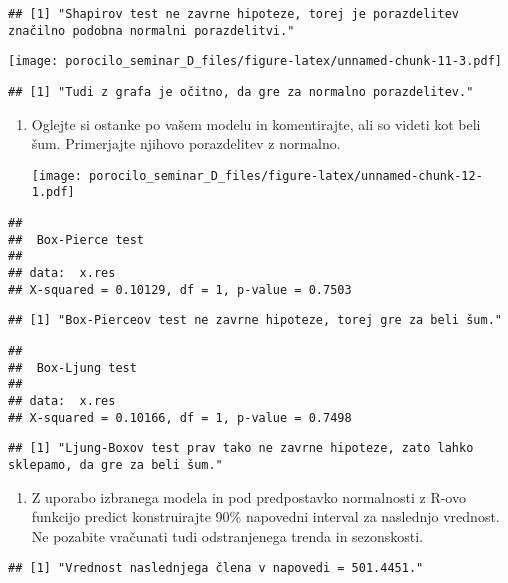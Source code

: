 \documentclass[
]{article}
\providecommand{\tightlist}{%
  \setlength{\itemsep}{0pt}\setlength{\parskip}{0pt}}
\begin{document}
\begin{verbatim}
## [1] "Shapirov test ne zavrne hipoteze, torej je porazdelitev značilno podobna normalni porazdelitvi."
\end{verbatim}

\texttt{[image: porocilo\_seminar\_D\_files/figure-latex/unnamed-chunk-11-3.pdf]}

\begin{verbatim}
## [1] "Tudi z grafa je očitno, da gre za normalno porazdelitev."
\end{verbatim}

\begin{enumerate}
\def\labelenumi{\arabic{enumi}.}
\setcounter{enumi}{6}
\tightlist
\item
  Oglejte si ostanke po vašem modelu in komentirajte, ali so videti kot
  beli šum. Primerjajte njihovo porazdelitev z normalno.

  \texttt{[image: porocilo\_seminar\_D\_files/figure-latex/unnamed-chunk-12-1.pdf]}
\end{enumerate}

\begin{verbatim}
## 
##  Box-Pierce test
## 
## data:  x.res
## X-squared = 0.10129, df = 1, p-value = 0.7503
\end{verbatim}

\begin{verbatim}
## [1] "Box-Pierceov test ne zavrne hipoteze, torej gre za beli šum."
\end{verbatim}

\begin{verbatim}
## 
##  Box-Ljung test
## 
## data:  x.res
## X-squared = 0.10166, df = 1, p-value = 0.7498
\end{verbatim}

\begin{verbatim}
## [1] "Ljung-Boxov test prav tako ne zavrne hipoteze, zato lahko sklepamo, da gre za beli šum."
\end{verbatim}

\begin{enumerate}
\def\labelenumi{\arabic{enumi}.}
\setcounter{enumi}{7}
\tightlist
\item
  Z uporabo izbranega modela in pod predpostavko normalnosti z R-ovo
  funkcijo predict konstruirajte 90\% napovedni interval za naslednjo
  vrednost. Ne pozabite vračunati tudi odstranjenega trenda in
  sezonskosti.
\end{enumerate}

\begin{verbatim}
## [1] "Vrednost naslednjega člena v napovedi = 501.4451."
\end{verbatim}
\end{document}
